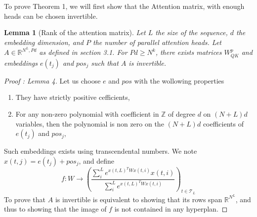 \documentclass{article}
\newtheorem{lemma}{Lemma}
\begin{document}
To prove Theorem 1, we will first show that the Attention matrix, with enough heads can be chosen invertible.

\begin{lemma}[Rank of the attention matrix]
    Let $L$ the size of the sequence, $d$ the embedding dimension, and $P$ the number of parallel attention heads. Let $A\in\mathbb{R}^{N^L, Pd}$ as defined in section 3.1.
    For $Pd \geq N^k$, there exists matrices $W_{QK}^p$ and embeddings $e(t_j)$ and $pos_j$ such that $A$ is invertible.
\end{lemma}


\begin{proof}[Proof : Lemma 4]
    Let us choose $e$ and $pos$ with the wollowing properties
    \begin{enumerate}
        \item They have strictly positive cefficients,
        \item For any non-zero polynomial with coefficient in $\mathbb{Z}$ of degree $d$ on $(N+L)d$ variables, then the polynomial is non zero
        on the $(N+L)d$ coefficients of $e(t_j)$ and $pos_j$,
    \end{enumerate}
    Such embeddings exists using transcendental numbers.
    We note $x(t, j) = e(t_j)+pos_j$, and define 
    \[f:W \rightarrow \left(\frac{\sum_{i}^Le^{x(t,L)^TWx(t,i)}x(t,i)}{\sum_{i}^Le^{x(t,L)^TWx(t,i)}}\right)_{t\in\mathcal{T}_L}\]
    To prove that $A$ is invertible is equivalent to showing that its rows span $\mathbb{R}^{N^L}$, and thus to showing that the image 
    of $f$ is not contained in any hyperplan.
    \bigbreak


\end{proof}
\end{document}
